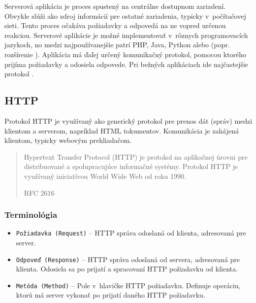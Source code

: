 \noindent Serverová aplikácia je proces spustený na centrálne dostupnom zariadení. Obvykle slúži ako zdroj informácií pre ostatné zariadenia, typicky v~počítačovej sieti. Tento proces očakáva požiadavky a odpovedá na ne vopred určenou reakciou. Serverové aplikácie je možné implementovať v~rôznych programovacích jazykoch, no medzi najpoužívanejšie patrí PHP, Java, Python alebo  (popr. rozšírenie ). Aplikácia má ďaľej určený komunikačný protokol, pomocou ktorého prijíma požiadavky a odosiela odpovede. Pri bežných aplikáciach ide najčastejšie protokol .

\vfill

\subsection{HTTP}
\label{subsection:http}
Protokol HTTP je využívaný ako generický protokol pre prenos dát (správ) medzi klientom a serverom, napríklad HTML tokumentov. Komunikácia je zahájená klientom, typicky webovým prehliadačom. \\

\blockquote[RFC 2616 \cite{RFC_HTTP}]{Hypertext Transfer Protocol (HTTP) je protokol na aplikačnej úrovni pre distribuované a spolupracujúce informačné systémy. Protokol HTTP je využívaný iniciatívou World Wide Web od roku 1990.}
 
\subsubsection{Terminológia}

\begin{itemize}
	\item \texttt{Požiadavka (Request)} -- HTTP správa odoslaná od klienta, adresovaná pre server.
	\item \texttt{Odpoveď (Response)} -- HTTP správa odoslaná od servera, adresovaná pre klienta. Odosiela sa po prijatí a spracovaní HTTP požiadavku od klienta.
	\item \texttt{Metóda (Method)} -- Pole v~hlavičke HTTP požiadavku. Definuje operáciu, ktorú má server vykonať po prijatí daného HTTP požiadavku.
\end{itemize}


